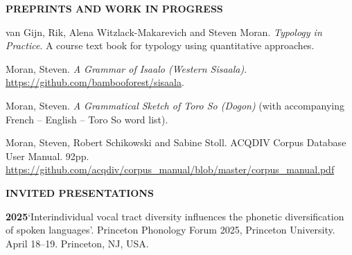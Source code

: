\documentclass[11pt]{article}
\newcommand{\hangpara}{
 \setlength{\parindent}{0in} %
 \hangindent=0.42in %
}
\begin{document}
\vskip 20pt
\begin{flushleft}
{\bf PREPRINTS AND WORK IN PROGRESS}
\end{flushleft}






\hangpara
van Gijn, Rik, Alena Witzlack-Makarevich and Steven Moran. {\it Typology in Practice}. A course text book for typology using quantitative approaches.

\vskip 6pt
\hangpara
Moran, Steven. \textit{A Grammar of Isaalo (Western Sisaala)}. \url{https://github.com/bambooforest/sisaala}.

\vskip 6pt
\hangpara
Moran, Steven. \textit{A Grammatical Sketch of Toro So (Dogon)} (with accompanying French -- English -- Toro So word list).


\vskip 6pt
\hangpara
Moran, Steven, Robert Schikowski and Sabine Stoll. ACQDIV Corpus Database User Manual. 92pp. \url{https://github.com/acqdiv/corpus_manual/blob/master/corpus_manual.pdf}



\vskip 20pt
\begin{flushleft}
{\bf INVITED PRESENTATIONS}
\end{flushleft}

\hangpara
{\bf 2025}\hspace{1ex}`Interindividual vocal tract diversity influences the phonetic diversification of spoken languages'. Princeton Phonology Forum 2025, Princeton University. April 18--19. Princeton, NJ, USA.
\end{document}
